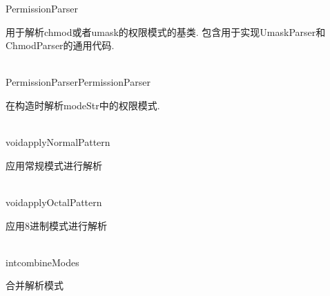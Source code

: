 \begin{XeClass}{PermissionParser}
   
 用于解析chmod或者umask的权限模式的基类.
 包含用于实现UmaskParser和ChmodParser的通用代码.

  \begin{XeMethod}{\XePublic\\ }{PermissionParser}{PermissionParser}
       
 在构造时解析modeStr中的权限模式.

  \end{XeMethod}

  \begin{XeMethod}{\XePrivate\\ }{void}{applyNormalPattern}
       
 应用常规模式进行解析

  \end{XeMethod}

  \begin{XeMethod}{\XePrivate\\ }{void}{applyOctalPattern}
       
 应用8进制模式进行解析

  \end{XeMethod}

  \begin{XeMethod}{\XeProtected\\ }{int}{combineModes}
       
 合并解析模式

  \end{XeMethod}

\end{XeClass}
